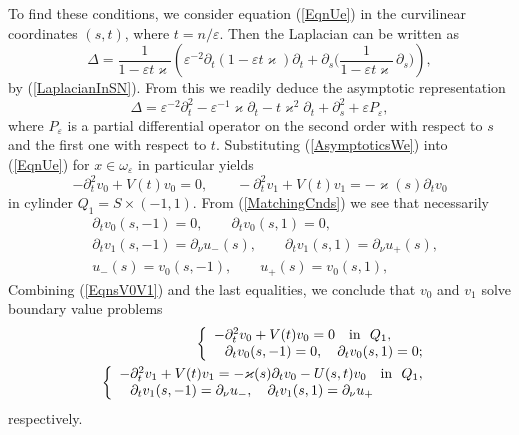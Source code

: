\documentclass[graybox]{svmult}
\renewcommand{\kappa}{\varkappa}
\newcommand{\eps}{\varepsilon}
\newcommand{\eqref}[1]{(\ref{#1})}
\newcommand{\pte}{\partial_t}
\begin{document}
To find these conditions, we consider equation \eqref{EqnUe} in the curvilinear coordinates $(s,t)$, where $t=n/\eps$.
Then the Laplacian can be written as
\begin{equation}
  \Delta =\frac1{1-\eps t\kappa}\left( \eps^{-2}\partial_t
(1-\eps t\kappa)\partial_t +\partial_s
\Big(\frac1{1-\eps t\kappa}\,\partial_s\Big)\right),
\end{equation}
by \eqref{LaplacianInSN}.
From this we readily deduce the asymptotic representation
$$
\Delta= \eps^{-2}\partial^2_t-\eps^{-1}\kappa\partial_t-t \kappa^2\partial_t+\partial^2_s+\eps P_\eps,
$$
where $P_\eps$ is a partial differential operator on the second order with respect to $s$ and the first one with respect to $t$.
Substituting \eqref{AsymptoticsWe} into \eqref{EqnUe} for $x\in \omega_\eps$ in particular yields
\begin{equation}\label{EqnsV0V1}
-\pte^2 v_0+V(t)v_0=0, \qquad -\pte^2 v_1+V(t)v_1=-\kappa(s)\pte v_0
\end{equation}
in cylinder $Q_1=S\times(-1,1)$.
From \eqref{MatchingCnds} we see that necessarily
\begin{eqnarray} \nonumber
  &\partial_t v_0(s,- 1)=0, \qquad \partial_t v_0(s, 1)=0, \\\nonumber
&\partial_t v_1(s, -1)=\partial_\nu u_-(s), \qquad
\partial_t v_1(s, 1)=\partial_\nu u_+(s),\\
\label{FittingCnds}
  &u_-(s)=v_0(s,-1),\qquad u_+(s)=v_0(s,1),
\end{eqnarray}
Combining \eqref{EqnsV0V1} and the last equalities, we conclude that $v_0$ and $v_1$ solve boundary value problems
\begin{eqnarray}\label{problemV0}
&&\left\{
  \begin{array}{ll}
    -\pte^2 v_0+V(t)v_0=0 \quad \hbox{in \ } Q_1, \\
    \phantom{-}\partial_t v_0(s,- 1)=0, \quad \partial_t v_0(s, 1)=0;
  \end{array}
\right.\\\label{problemV1}
&&\left\{
  \begin{array}{ll}
    -\pte^2 v_1+V(t)v_1=-\kappa(s)\pte v_0-U(s,t)v_0\quad \hbox{in \ } Q_1, \\
    \phantom{-}\partial_t v_1(s, -1)=\partial_\nu u_-, \quad
\partial_t v_1(s, 1)=\partial_\nu u_+
  \end{array}
\right.
\end{eqnarray}
respectively.
\end{document}
